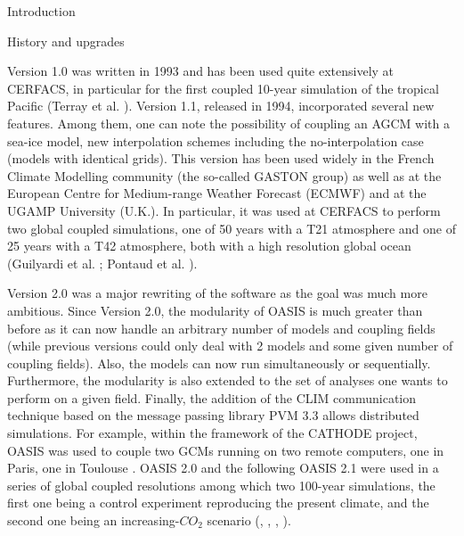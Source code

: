 \begin{section}{Introduction}
\begin{subsection}{History and upgrades}
\vspace{0.4cm}

Version 1.0 was written in 1993 and has been used quite extensively at
CERFACS, in particular for the first coupled 10-year simulation of the
tropical Pacific (Terray et al. \cite{terray}).
Version 1.1, released in 1994, incorporated several new
features. Among them, one can note
the possibility of coupling an AGCM with a sea-ice model,
new interpolation schemes including the no-interpolation case 
(models with identical grids).
This version has been used widely in the French Climate Modelling
community (the so-called GASTON group) as well as at the European
Centre for Medium-range Weather Forecast (ECMWF) and at the UGAMP
University (U.K.). In particular, it was used at CERFACS to perform
two global coupled simulations, one of 50 years with a T21 atmosphere
and one of 25 years with a T42 atmosphere, both with a high resolution
global ocean (Guilyardi et al. \cite{guilyardi};
Pontaud et al. \cite{pontaud}).

\vspace{0.4cm}

Version 2.0 was a major rewriting of the software as the goal
was much more ambitious. Since Version 2.0, the modularity of OASIS is
much greater than before as it can now handle an arbitrary number
of models and coupling fields (while previous versions could only deal
with 2 models and some given number of coupling fields). Also, the
models can now run simultaneously or sequentially.
Furthermore, the modularity is also extended to
the set of analyses one wants to perform on a given field. Finally, the
addition of the CLIM communication technique based on the message passing library
PVM 3.3 allows distributed simulations. For example, within the framework 
of the CATHODE project, OASIS was used to couple two GCMs running on two remote
computers, one in Paris, one in Toulouse \cite{cassou}.
OASIS 2.0 and the following OASIS 2.1 were used in a series of global
coupled resolutions among which two 100-year simulations, the first one being
a control experiment reproducing the present climate, and the second one 
being an increasing-$CO_2$ scenario (\cite{guil_climdyn_97},
\cite{guil_jpo_98}, \cite{bart_CRAS_98}, \cite{bart_GRL_98}).

\vspace{0.4cm}


\end{subsection}
\end{section}
